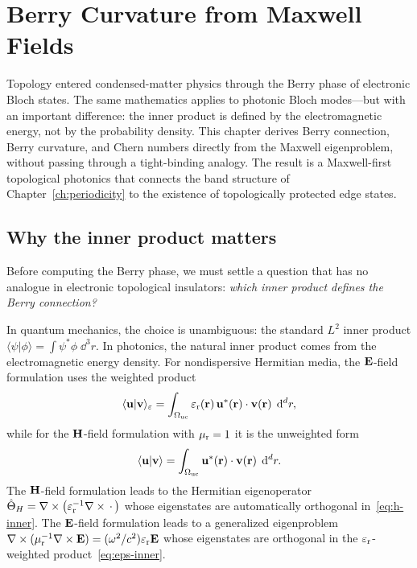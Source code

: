 \chapter{Berry Curvature from Maxwell Fields}
\label{ch:berry-maxwell}

\begin{chapterlead}
Topology entered condensed-matter physics through the Berry phase of
electronic Bloch states. The same mathematics applies to photonic Bloch
modes---but with an important difference: the inner product is defined by
the electromagnetic energy, not by the probability density. This chapter
derives Berry connection, Berry curvature, and Chern numbers directly from
the Maxwell eigenproblem, without passing through a tight-binding analogy.
The result is a Maxwell-first topological photonics that connects the
band structure of Chapter~\ref{ch:periodicity} to the existence of
topologically protected edge states.
\end{chapterlead}


\section{Why the inner product matters}
\label{sec:inner-product-matters}

Before computing the Berry phase, we must settle a question that has no
analogue in electronic topological insulators: \emph{which inner product
defines the Berry connection?}

In quantum mechanics, the choice is unambiguous: the standard
$L^2$ inner product $\langle\psi|\phi\rangle = \int\psi^*\phi\;\dd^3r$.
In photonics, the natural inner product comes from the electromagnetic
energy density. For nondispersive Hermitian media, the $\mathbf{E}$-field
formulation uses the weighted product
\begin{equation}
 \langle\mathbf{u}|\mathbf{v}\rangle_\varepsilon
 = \int_{\Omega_{\mathrm{uc}}}
 \varepsilon_{\mathrm{r}}(\mathbf{r})\,\mathbf{u}^*(\mathbf{r})\cdot\mathbf{v}(\mathbf{r})\;\mathop{}\!\mathrm{d}^d r,
 \label{eq:eps-inner}
\end{equation}
while for the $\mathbf{H}$-field formulation with $\mu_{\mathrm{r}}=1$ it is the unweighted
form
\begin{equation}
 \langle\mathbf{u}|\mathbf{v}\rangle
 = \int_{\Omega_{\mathrm{uc}}}
 \mathbf{u}^*(\mathbf{r})\cdot\mathbf{v}(\mathbf{r})\;\mathop{}\!\mathrm{d}^d r.
 \label{eq:h-inner}
\end{equation}
The $\mathbf{H}$-field formulation leads to the Hermitian eigenoperator
$\hat{\Theta}_H = \nabla\times\bigl(\varepsilon_{\mathrm{r}}^{-1}\nabla\times\,\cdot\,\bigr)$ whose
eigenstates are automatically orthogonal in~\eqref{eq:h-inner}. The
$\mathbf{E}$-field formulation leads to a generalized eigenproblem
$\nabla\times(\mu_{\mathrm{r}}^{-1}\nabla\times\mathbf{E}) = (\omega^2/c^2)\varepsilon_{\mathrm{r}}\mathbf{E}$ whose eigenstates
are orthogonal in the $\varepsilon_{\mathrm{r}}$-weighted product~\eqref{eq:eps-inner}.

